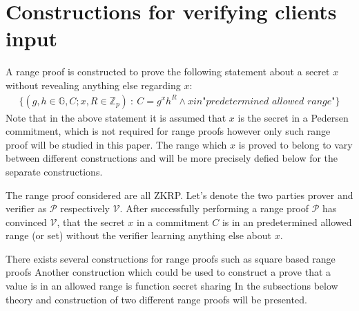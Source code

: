 

\section{Constructions for verifying clients input}
\label{sec:RF_theory}
A range proof is constructed to prove the following statement about a secret $x$ without revealing anything else regarding $x$:
\begin{align*}
    \{(g,h\in\mathds{G},C;x,R\in\mathds{Z}_p)\::\:C= g^x h^R \wedge x in \textit{"predetermined allowed range"}\}
\end{align*}
Note that in the above statement  it is assumed that $x$ is the secret in a Pedersen commitment, which is not required for range proofs however only such range proof will be studied in this paper. The range which $x$ is proved to belong to vary between different constructions and will be more precisely defied below for the separate constructions. 

The range proof considered are all ZKRP.  Let's denote the two parties prover and verifier as  $\mathcal{P}$ respectively $\mathcal{V}$. After successfully performing a range proof  $\mathcal{P}$ has convinced $\mathcal{V}$, that the secret $x$ in a commitment $C$ is in an predetermined allowed range (or set) without the verifier learning anything else about $x$.

There exists several constructions for  range proofs such as square based range proofs \cite{Efficient _proof_interval} %
Another construction which could be used to construct a prove that a value is in an allowed range is function secret sharing \cite{FSS} %
 In the subsections below theory and construction of two different range proofs will be presented.




